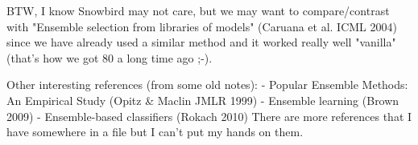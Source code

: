 
BTW, I know Snowbird may not care, but we may want to compare/contrast
with "Ensemble selection from libraries of models" (Caruana et al.
ICML 2004) since we have already used a similar method and it worked
really well "vanilla" (that's how we got 80%
a long time ago ;-).

Other interesting references (from some old notes):
- Popular Ensemble Methods: An Empirical Study (Opitz & Maclin JMLR 1999)
- Ensemble learning (Brown 2009)
- Ensemble-based classifiers (Rokach 2010)
There are more references that I have somewhere in a file but I can't
put my hands on them.

